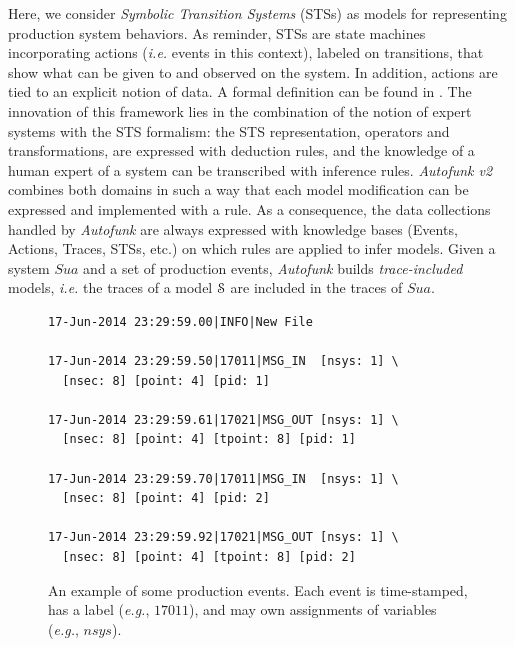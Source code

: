 Here, we consider \textit{Symbolic Transition Systems} (STSs) as
models for representing production system behaviors. As reminder,
STSs are state machines incorporating actions (\emph{i.e.} events
in this context), labeled on transitions, that show what can be
given to and observed on the system. In addition, actions are
tied to an explicit notion of data. A formal definition can
be found in .
The innovation of this framework lies in the combination of the
notion of expert systems with the STS formalism: the STS
representation, operators and transformations, are expressed
with deduction rules, and the knowledge of a human expert of a
system can be transcribed with inference rules.
\textit{Autofunk v2} combines both domains in such a way that
each model modification can be expressed and implemented with a
rule.  As a consequence, the data collections handled by
\textit{Autofunk} are always expressed with knowledge bases
(Events, Actions, Traces, STSs, etc.) on which rules are applied
to infer models. Given a system $\mathit{Sua}$ and a set of
production events, \textit{Autofunk} builds \emph{trace-included}
models, \emph{i.e.} the traces of a model $\EuScript{S}$ are
included in the traces of $\mathit{Sua}$.

\begin{figure}[ht]
\begin{framed}
\begin{BVerbatim}
17-Jun-2014 23:29:59.00|INFO|New File

17-Jun-2014 23:29:59.50|17011|MSG_IN  [nsys: 1] \
  [nsec: 8] [point: 4] [pid: 1]

17-Jun-2014 23:29:59.61|17021|MSG_OUT [nsys: 1] \
  [nsec: 8] [point: 4] [tpoint: 8] [pid: 1]

17-Jun-2014 23:29:59.70|17011|MSG_IN  [nsys: 1] \
  [nsec: 8] [point: 4] [pid: 2]

17-Jun-2014 23:29:59.92|17021|MSG_OUT [nsys: 1] \
  [nsec: 8] [point: 4] [tpoint: 8] [pid: 2]
\end{BVerbatim}
\end{framed}

\caption{An example of some production events. Each event is
time-stamped, has a label (\emph{e.g.}, $17011$), and may own
assignments of variables (\emph{e.g.}, $nsys$).}
\label{fig:rawdatum}
\end{figure}

